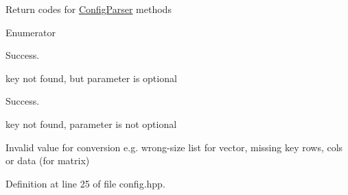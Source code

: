 Return codes for \hyperlink{classbeam_1_1_config_parser}{Config\+Parser} methods \begin{Desc}
\item[Enumerator]\par
\begin{description}
\item[{\em 
OK\hypertarget{group__utils_gga6b948c6f49abd3a3de95390efacfba63ae0aa021e21dddbd6d8cecec71e9cf564}{}\label{group__utils_gga6b948c6f49abd3a3de95390efacfba63ae0aa021e21dddbd6d8cecec71e9cf564}
}]Success. \item[{\em 
Missing\+Optional\+Key\hypertarget{group__utils_gga6b948c6f49abd3a3de95390efacfba63ab150e1b84c6f67e2bebfa5a682f71a37}{}\label{group__utils_gga6b948c6f49abd3a3de95390efacfba63ab150e1b84c6f67e2bebfa5a682f71a37}
}]key not found, but parameter is optional \item[{\em 
File\+Error\hypertarget{group__utils_gga6b948c6f49abd3a3de95390efacfba63a06344c468073b2b66824779ffa5105cc}{}\label{group__utils_gga6b948c6f49abd3a3de95390efacfba63a06344c468073b2b66824779ffa5105cc}
}]Success. \item[{\em 
Key\+Error\hypertarget{group__utils_gga6b948c6f49abd3a3de95390efacfba63ac84999914a408f8c02b4122a49df6e00}{}\label{group__utils_gga6b948c6f49abd3a3de95390efacfba63ac84999914a408f8c02b4122a49df6e00}
}]key not found, parameter is not optional \item[{\em 
Conversion\+Error\hypertarget{group__utils_gga6b948c6f49abd3a3de95390efacfba63a33f8a28d3c790e00d94cc848895dfb51}{}\label{group__utils_gga6b948c6f49abd3a3de95390efacfba63a33f8a28d3c790e00d94cc848895dfb51}
}]Invalid value for conversion e.\+g. wrong-\/size list for vector, missing key \textquotesingle{}rows\textquotesingle{}, \textquotesingle{}cols\textquotesingle{} or \textquotesingle{}data\textquotesingle{} (for matrix) \end{description}
\end{Desc}


Definition at line 25 of file config.\+hpp.



